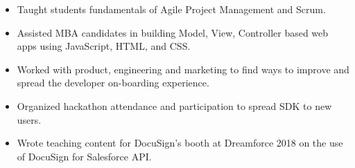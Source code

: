 \documentclass[10pt,a4paper,ragged2e]{altacv}
\begin{document}

\makecvheader



\begin{itemize}
\item Taught students fundamentals of Agile Project Management and Scrum.
\item Assisted MBA candidates in building Model, View, Controller based web apps using JavaScript, HTML, and CSS.
\end{itemize}
\divider

\begin{itemize}
\item Worked with product, engineering and marketing to find ways to improve and spread the developer on-boarding experience.
\item Organized hackathon attendance and participation to spread SDK to new users.
\item Wrote teaching content for DocuSign's booth at Dreamforce 2018 on the use of DocuSign for Salesforce API.
\end{itemize}
\divider
\end{document}
